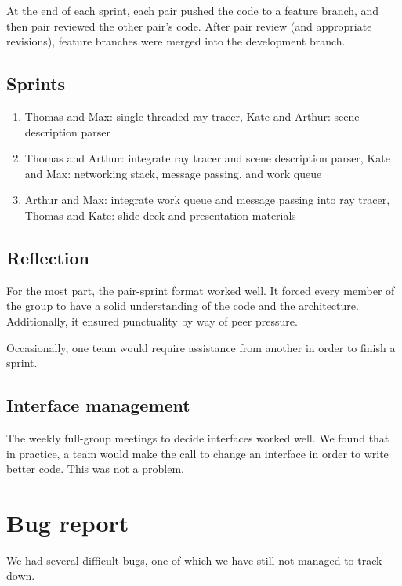 \documentclass[letterpaper,twocolumn,10pt]{article}
\begin{document}
At the end of each sprint, each pair pushed the code to a feature branch, and
then pair reviewed the other pair's code. After pair review (and appropriate
revisions), feature branches were merged into the development branch.

\subsection{Sprints}

\begin{enumerate}[(1)]
\item Thomas and Max: single-threaded ray tracer, Kate and Arthur: scene
  description parser

\item Thomas and Arthur: integrate ray tracer and scene description parser, Kate
  and Max: networking stack, message passing, and work queue

\item Arthur and Max: integrate work queue and message passing into ray tracer,
  Thomas and Kate: slide deck and presentation materials
\end{enumerate}

\subsection{Reflection}

For the most part, the pair-sprint format worked well. It forced every member of
the group to have a solid understanding of the code and the architecture.
Additionally, it ensured punctuality by way of peer pressure.

Occasionally, one team would require assistance from another in order to finish
a sprint.

\subsection{Interface management}

The weekly full-group meetings to decide interfaces worked well. We found that
in practice, a team would make the call to change an interface in order to write
better code. This was not a problem.

\section{Bug report}

We had several difficult bugs, one of which we have still not managed to track
down.
\end{document}
